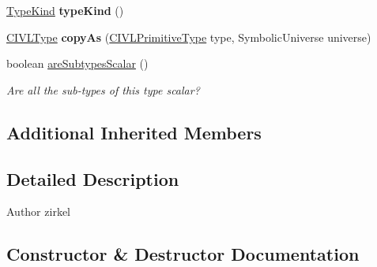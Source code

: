 \begin{DoxyCompactItemize}
\item 
\hypertarget{classedu_1_1udel_1_1cis_1_1vsl_1_1civl_1_1model_1_1common_1_1type_1_1CommonStructOrUnionType_a2769714e24b1b6dc0227a311c69a8e76}{}\hyperlink{enumedu_1_1udel_1_1cis_1_1vsl_1_1civl_1_1model_1_1IF_1_1type_1_1CIVLType_1_1TypeKind}{Type\+Kind} {\bfseries type\+Kind} ()\label{classedu_1_1udel_1_1cis_1_1vsl_1_1civl_1_1model_1_1common_1_1type_1_1CommonStructOrUnionType_a2769714e24b1b6dc0227a311c69a8e76}

\item 
\hypertarget{classedu_1_1udel_1_1cis_1_1vsl_1_1civl_1_1model_1_1common_1_1type_1_1CommonStructOrUnionType_aa9738de0e80f496ff24ccdebc19dd729}{}\hyperlink{interfaceedu_1_1udel_1_1cis_1_1vsl_1_1civl_1_1model_1_1IF_1_1type_1_1CIVLType}{C\+I\+V\+L\+Type} {\bfseries copy\+As} (\hyperlink{interfaceedu_1_1udel_1_1cis_1_1vsl_1_1civl_1_1model_1_1IF_1_1type_1_1CIVLPrimitiveType}{C\+I\+V\+L\+Primitive\+Type} type, Symbolic\+Universe universe)\label{classedu_1_1udel_1_1cis_1_1vsl_1_1civl_1_1model_1_1common_1_1type_1_1CommonStructOrUnionType_aa9738de0e80f496ff24ccdebc19dd729}

\item 
boolean \hyperlink{classedu_1_1udel_1_1cis_1_1vsl_1_1civl_1_1model_1_1common_1_1type_1_1CommonStructOrUnionType_a16a635ed3d26487dd557045ad7ccf8c2}{are\+Subtypes\+Scalar} ()
\begin{DoxyCompactList}\small\item\em Are all the sub-\/types of this type scalar? \end{DoxyCompactList}\end{DoxyCompactItemize}
\subsection*{Additional Inherited Members}


\subsection{Detailed Description}
\begin{DoxyAuthor}{Author}
zirkel 
\end{DoxyAuthor}


\subsection{Constructor \& Destructor Documentation}
\hypertarget{classedu_1_1udel_1_1cis_1_1vsl_1_1civl_1_1model_1_1common_1_1type_1_1CommonStructOrUnionType_adb6b89296baba63864d736c7cb405ec3}{}
